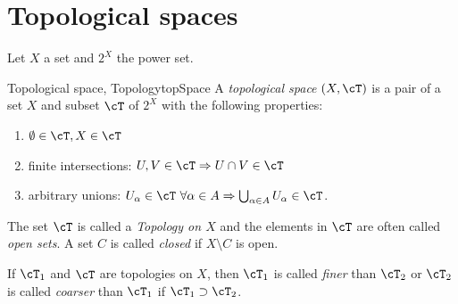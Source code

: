 \documentclass[language=english]{../../Template/TemplateLecture}
\begin{document}
\section{Topological spaces}

Let $X$ a set and $2^X$ the power set.

\begin{defi}{Topological space, Topology}{topSpace}
    A \emph{topological space} $(X, \cT)$ is a pair of a set $X$ and subset $\cT$ of $2^X$ with the following properties:
    \begin{enumerate}[$(i)$]
        \item $\emptyset \in \cT, X \in \cT$
        \item finite intersections: $U, V \in \cT \Rightarrow U \cap V \in \cT$
        \item arbitrary unions: $U_\alpha \in \cT ~\forall \alpha \in A \Rightarrow \bigcup_{\alpha \in A} U_\alpha \in \cT$.
    \end{enumerate}
    The set $\cT$ is called a \emph{Topology on $X$} and the elements in $\cT$ are often called \emph{open sets}. A set $C$ is called \emph{closed} if $X \setminus C$ is open.

    If $\cT_1$ and $\cT$ are topologies on $X$, then $\cT_1$ is called \emph{finer} than $\cT_2$ or $\cT_2$ is called \emph{coarser} than $\cT_1$ if $\cT_1 \supset \cT_2$.
\end{defi}
\end{document}
